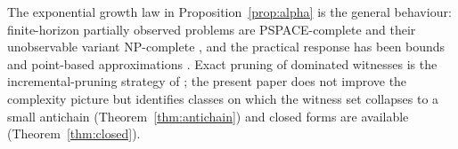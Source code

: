 \begin{remark}[complexity]\label{rem:complexity}
The exponential growth law in Proposition~\ref{prop:alpha} is the general behaviour: finite-horizon partially observed problems are PSPACE-complete and their unobservable variant NP-complete \cite{PapadimitriouTsitsiklis1987}, and the practical response has been bounds and point-based approximations \cite{Lovejoy1991,Pineau2003}. Exact pruning of dominated witnesses is the incremental-pruning strategy of \cite{Cassandra1997}; the present paper does not improve the complexity picture but identifies classes on which the witness set collapses to a small antichain (Theorem~\ref{thm:antichain}) and closed forms are available (Theorem~\ref{thm:closed}).
\end{remark}
